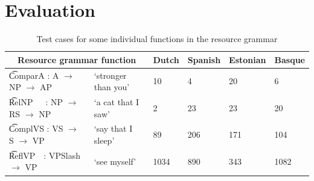 % 



\section{Evaluation}
\label{sec:evalGF}

\begin{table}[h]
\centering
{}
\caption{Test cases for all functions in three grammars}
\label{results}
\end{table}


\begin{table}[h]

\centering
\begin{tabular}{|ll|l|l|l|l|}
\hline
\multicolumn{2}{|c|}{\bf Resource grammar function} & {\bf Dutch} & {\bf Spanish}
   & {\bf Estonian} & {\bf Basque} \\ \hline

\t{ComparA : A  $\rightarrow$ NP $\rightarrow$ AP~} & `stronger than you' & 10   & 4   & 20 & 6   \\
\t{RelNP~~~: NP $\rightarrow$ RS $\rightarrow$ NP~} & `a cat that I saw'  & 2    & 23 & 23 & 20   \\
\t{ComplVS : VS $\rightarrow$ S  $\rightarrow$ VP~} &`say that I sleep'  & 89   & 206 & 171 & 104 \\
\t{ReflVP~~: VPSlash $\rightarrow$ VP~~} & `see myself'        & 1034 & 890 & 343 & 1082 \\
\hline
\end{tabular}
\caption{Test cases for some individual functions in the resource
  grammar}
\label{results_indiv}
\end{table}

